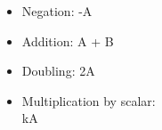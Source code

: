 \begin{itemize}
  \item Negation: -A
  \item Addition: A + B
  \item Doubling: 2A
  \item Multiplication by scalar: \\ kA
\end{itemize}
